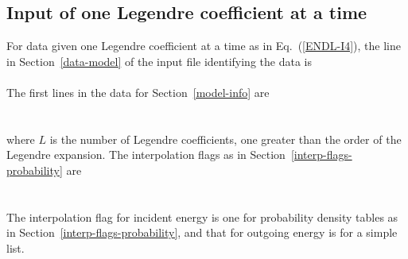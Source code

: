 \subsection{Input of one Legendre coefficient at a time}\label{sec:ENDL-I4}
For data given one Legendre coefficient at a time as in Eq.~(\ref{ENDL-I4}),
the line in Section~\ref{data-model} of the input
file identifying the data is\\
      \\
The first lines in the data for Section~\ref{model-info} are\\
  \\
 \\
where $L$ is the number of Legendre coefficients, one greater than the
order of the Legendre expansion.  The interpolation flags as
in Section~\ref{interp-flags-probability} are\\
   \\
  \\
The interpolation flag for incident energy is one for probability density
tables as in Section~\ref{interp-flags-probability}, and that for outgoing energy 
is for a simple list.

